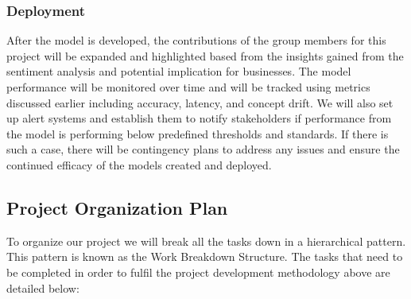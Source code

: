 \documentclass[stu,12pt,floatsintext]{apa7}
\begin{document}
\subsubsection{Deployment}
After the model is developed, the contributions of the group members for this project will be expanded and highlighted based from the insights gained from the sentiment analysis and potential implication for businesses. The model performance will be monitored over time and will be tracked using metrics discussed earlier including accuracy, latency, and concept drift. We will also set up alert systems and establish them to notify stakeholders if performance from the model is performing below predefined thresholds and standards. If there is such a case, there will be contingency plans to address any issues and ensure the continued efficacy of the models created and deployed. 

\subsection{Project Organization Plan}
To organize our project we will break all the tasks down in a hierarchical pattern. This pattern is known as the Work Breakdown Structure. The tasks that need to be completed in order to fulfil the project development methodology above are detailed below:
\end{document}
